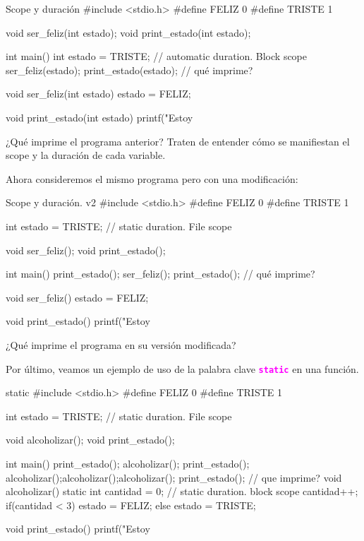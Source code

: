 \documentclass[]{scrartcl}
\newcommand{\hl}[1]{\textcolor{magenta}{\textbf{\texttt{#1}}}}
\begin{document}
\begin{cbox}[]{Scope y duración}
  #include <stdio.h>
  #define FELIZ 0
  #define TRISTE 1
  
  void ser_feliz(int estado);
  void print_estado(int estado);
  
  int main(){
    int estado = TRISTE; // automatic duration. Block scope
    ser_feliz(estado);
    print_estado(estado); // qué imprime?
  }
  
  void ser_feliz(int estado){
    estado = FELIZ;
  }

  void print_estado(int estado){
    printf("Estoy %
  }
\end{cbox}

\begin{exbox}
  ¿Qué imprime el programa anterior? Traten de entender cómo se manifiestan el scope y la duración de cada variable. 
\end{exbox}

Ahora consideremos el mismo programa pero con una modificación:

\begin{cbox}[]{Scope y duración. v2}
  #include <stdio.h>
  #define FELIZ 0
  #define TRISTE 1
  
  int estado = TRISTE; // static duration. File scope
  
  void ser_feliz();
  void print_estado();
  
  int main(){
    print_estado();
    ser_feliz();
    print_estado(); // qué imprime?
  }
  
  void ser_feliz(){
    estado = FELIZ;
  }
  
  void print_estado(){
    printf("Estoy %
  }
\end{cbox}

\begin{exbox}
  ¿Qué imprime el programa en su versión modificada? 
\end{exbox}


Por último, veamos un ejemplo de uso de la palabra clave \hl{static} en una función.

\begin{cbox}[]{static}
  #include <stdio.h>
  #define FELIZ 0
  #define TRISTE 1

  int estado = TRISTE; // static duration. File scope
  
  void alcoholizar();
  void print_estado();
  
  int main(){
    print_estado();
    alcoholizar();
    print_estado();
    alcoholizar();alcoholizar();alcoholizar();
    print_estado(); // que imprime?
  }
  void alcoholizar(){
    static int cantidad = 0; // static duration. block scope
    cantidad++;
    if(cantidad < 3){
      estado = FELIZ;
    }else{
      estado = TRISTE;
    }
  }
  
  void print_estado(){
    printf("Estoy %
  }
\end{cbox}
\end{document}
